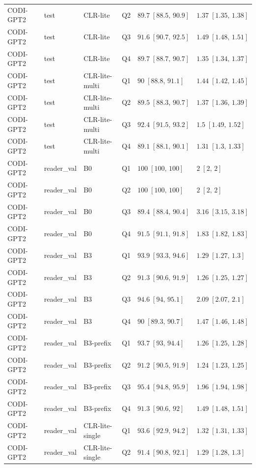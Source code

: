 \begin{longtable}{@{}p{}p{}p{}p{}p{}p{}@{}}
CODI-GPT2 & test & CLR-lite & Q2 & $89.7\;[88.5,\,90.9]$ & $1.37\;[1.35,\,1.38]$ \\
CODI-GPT2 & test & CLR-lite & Q3 & $91.6\;[90.7,\,92.5]$ & $1.49\;[1.48,\,1.51]$ \\
CODI-GPT2 & test & CLR-lite & Q4 & $89.7\;[88.7,\,90.7]$ & $1.35\;[1.34,\,1.37]$ \\
CODI-GPT2 & test & CLR-lite-multi & Q1 & $90\;[88.8,\,91.1]$ & $1.44\;[1.42,\,1.45]$ \\
CODI-GPT2 & test & CLR-lite-multi & Q2 & $89.5\;[88.3,\,90.7]$ & $1.37\;[1.36,\,1.39]$ \\
CODI-GPT2 & test & CLR-lite-multi & Q3 & $92.4\;[91.5,\,93.2]$ & $1.5\;[1.49,\,1.52]$ \\
CODI-GPT2 & test & CLR-lite-multi & Q4 & $89.1\;[88.1,\,90.1]$ & $1.31\;[1.3,\,1.33]$ \\
CODI-GPT2 & reader\_val & B0 & Q1 & $100\;[100,\,100]$ & $2\;[2,\,2]$ \\
CODI-GPT2 & reader\_val & B0 & Q2 & $100\;[100,\,100]$ & $2\;[2,\,2]$ \\
CODI-GPT2 & reader\_val & B0 & Q3 & $89.4\;[88.4,\,90.4]$ & $3.16\;[3.15,\,3.18]$ \\
CODI-GPT2 & reader\_val & B0 & Q4 & $91.5\;[91.1,\,91.8]$ & $1.83\;[1.82,\,1.83]$ \\
CODI-GPT2 & reader\_val & B3 & Q1 & $93.9\;[93.3,\,94.6]$ & $1.29\;[1.27,\,1.3]$ \\
CODI-GPT2 & reader\_val & B3 & Q2 & $91.3\;[90.6,\,91.9]$ & $1.26\;[1.25,\,1.27]$ \\
CODI-GPT2 & reader\_val & B3 & Q3 & $94.6\;[94,\,95.1]$ & $2.09\;[2.07,\,2.1]$ \\
CODI-GPT2 & reader\_val & B3 & Q4 & $90\;[89.3,\,90.7]$ & $1.47\;[1.46,\,1.48]$ \\
CODI-GPT2 & reader\_val & B3-prefix & Q1 & $93.7\;[93,\,94.4]$ & $1.26\;[1.25,\,1.28]$ \\
CODI-GPT2 & reader\_val & B3-prefix & Q2 & $91.2\;[90.5,\,91.9]$ & $1.24\;[1.23,\,1.25]$ \\
CODI-GPT2 & reader\_val & B3-prefix & Q3 & $95.4\;[94.8,\,95.9]$ & $1.96\;[1.94,\,1.98]$ \\
CODI-GPT2 & reader\_val & B3-prefix & Q4 & $91.3\;[90.6,\,92]$ & $1.49\;[1.48,\,1.51]$ \\
CODI-GPT2 & reader\_val & CLR-lite-single & Q1 & $93.6\;[92.9,\,94.2]$ & $1.32\;[1.31,\,1.33]$ \\
CODI-GPT2 & reader\_val & CLR-lite-single & Q2 & $91.4\;[90.8,\,92.1]$ & $1.29\;[1.28,\,1.3]$ \\

\end{longtable}
